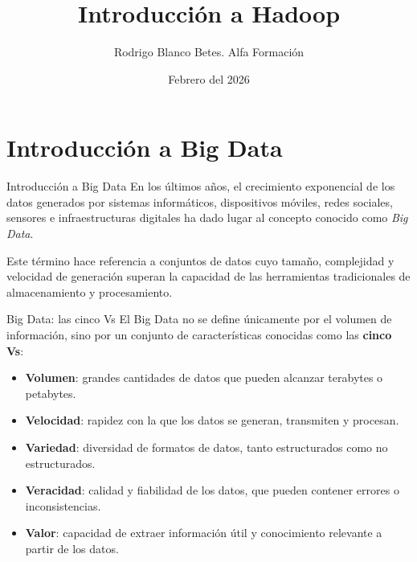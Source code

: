 \documentclass{beamer}
\title{Introducción a Hadoop}
\author{Rodrigo Blanco Betes. Alfa Formación}
\date{Febrero del 2026}
\begin{document}
\begin{frame}
\titlepage
\end{frame}

\begin{frame}
\tableofcontents
\end{frame}


\section{Introducción a Big Data}

\begin{frame}{Introducción a Big Data}
En los últimos años, el crecimiento exponencial de los datos generados por sistemas informáticos, dispositivos móviles, redes sociales, sensores e infraestructuras digitales ha dado lugar al concepto conocido como \textit{Big Data}.

Este término hace referencia a conjuntos de datos cuyo tamaño, complejidad y velocidad de generación superan la capacidad de las herramientas tradicionales de almacenamiento y procesamiento.
\end{frame}

\begin{frame}{Big Data: las cinco Vs}
El Big Data no se define únicamente por el volumen de información, sino por un conjunto de características conocidas como las \textbf{cinco Vs}:
\begin{itemize}
    \item \textbf{Volumen}: grandes cantidades de datos que pueden alcanzar terabytes o petabytes.
    \item \textbf{Velocidad}: rapidez con la que los datos se generan, transmiten y procesan.
    \item \textbf{Variedad}: diversidad de formatos de datos, tanto estructurados como no estructurados.
    \item \textbf{Veracidad}: calidad y fiabilidad de los datos, que pueden contener errores o inconsistencias.
    \item \textbf{Valor}: capacidad de extraer información útil y conocimiento relevante a partir de los datos.
\end{itemize}
\end{frame}
\end{document}
